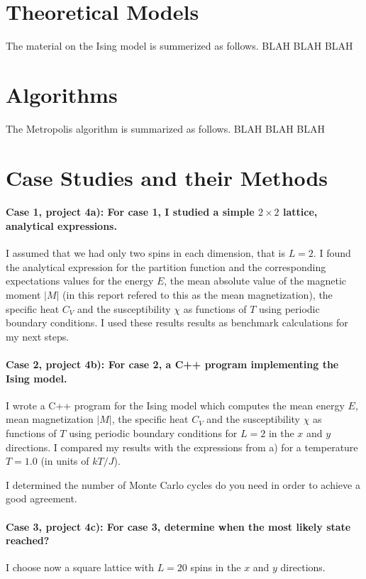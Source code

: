\documentclass[10pt,showpacs,preprintnumbers,footinbib,amsmath,amssymb,aps,prl,twocolumn,groupedaddress,superscriptaddress,showkeys]{revtex4-1}
\begin{document}
\section{Theoretical Models}
The material on the Ising model is summerized as follows. 
BLAH BLAH BLAH

\section{Algorithms}
The Metropolis algorithm is summarized as follows.
BLAH BLAH BLAH 

\section{Case Studies and their Methods}

\paragraph{Case 1, project 4a): For case 1, I studied a simple $2\times 2$ lattice, analytical expressions.}
I assumed that we had only two spins in each dimension, that is $L=2$. I found the analytical expression 
for the partition function and the corresponding
expectations values for the energy $E$, the mean absolute value of the magnetic moment $\vert M\vert$ (in this report refered to this as the mean magnetization), 
the specific heat $C_V$ and the susceptibility $\chi$ 
as functions of  $T$ using periodic boundary conditions. I used these results results as benchmark calculations for my next steps.

\paragraph{Case 2, project 4b):  For case 2, a C++ program implementing the Ising model.}
I wrote a C++ program for the Ising model which computes the mean energy 
$E$, mean magnetization 
$\vert M\vert$, the specific heat $C_V$ and the susceptibility $\chi$ 
as functions of  $T$ using periodic boundary conditions for 
$L=2$ in the $x$ and $y$ directions. 
I compared my results with the expressions from a)
for  a  temperature $T=1.0$ (in units of $kT/J$). 

I determined the number of Monte Carlo cycles do you need in order to achieve a good agreement.

\paragraph{Case 3, project 4c): For case 3, determine when the most likely state reached?}
I choose now a square lattice with $L=20$ spins in the $x$ and $y$ directions. 
\end{document}
